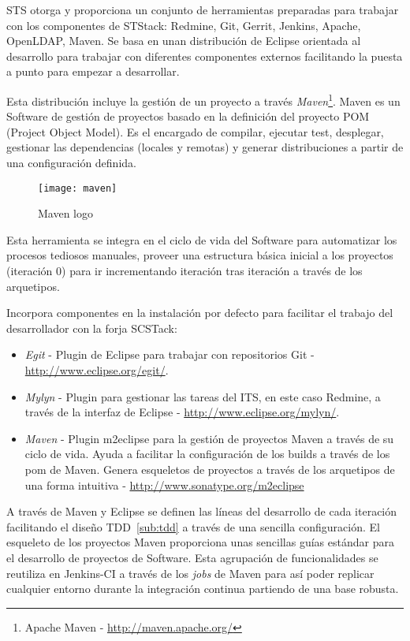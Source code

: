 \par STS otorga y proporciona un conjunto de herramientas preparadas para trabajar con los componentes de STStack: Redmine, Git, Gerrit, Jenkins, Apache, OpenLDAP, Maven. Se basa en unan distribución de Eclipse orientada al desarrollo para trabajar con diferentes componentes externos facilitando la puesta a punto para empezar a desarrollar.

\par Esta distribución incluye la gestión de un proyecto a través \emph{Maven}\footnote{Apache Maven - \url{http://maven.apache.org/}}. Maven es un Software de gestión de proyectos basado en la definición del proyecto POM (Project Object Model). Es el encargado de compilar, ejecutar test, desplegar, gestionar las dependencias (locales y remotas) y generar distribuciones a partir de una configuración definida.

\begin{figure}[H]
    \centering
    \texttt{[image: maven]}
    \caption{Maven logo}
    \label{fig:maven-logo}
\end{figure}

\par Esta herramienta se integra en el ciclo de vida del Software para automatizar los procesos tediosos manuales, proveer una estructura básica inicial a los proyectos (iteración 0) para ir incrementando iteración tras iteración a través de los arquetipos.

\par Incorpora componentes en la instalación por defecto para facilitar el trabajo del desarrollador con la forja SCSTack:

\begin{itemize}
	\item \emph{Egit} - Plugin de Eclipse para trabajar con repositorios Git - \url{http://www.eclipse.org/egit/}.
	\item \emph{Mylyn} - Plugin para gestionar las tareas del ITS, en este caso Redmine, a través de la interfaz de Eclipse - \url{http://www.eclipse.org/mylyn/}.
	\item \emph{Maven} - Plugin m2eclipse para la gestión de proyectos Maven a través de su ciclo de vida. Ayuda a facilitar la configuración de los builds a través de los pom de Maven. Genera esqueletos de proyectos a través de los arquetipos de una forma intuitiva - \url{http://www.sonatype.org/m2eclipse}
\end{itemize}

\par A través de Maven y Eclipse se definen las líneas del desarrollo de cada iteración facilitando el diseño TDD~\ref{sub:tdd} a través de una sencilla configuración. El esqueleto de los proyectos Maven proporciona unas sencillas guías estándar para el desarrollo de proyectos de Software. Esta agrupación de funcionalidades se reutiliza en Jenkins-CI a través de los \emph{jobs} de Maven para así poder replicar cualquier entorno durante la integración continua partiendo de una base robusta.

